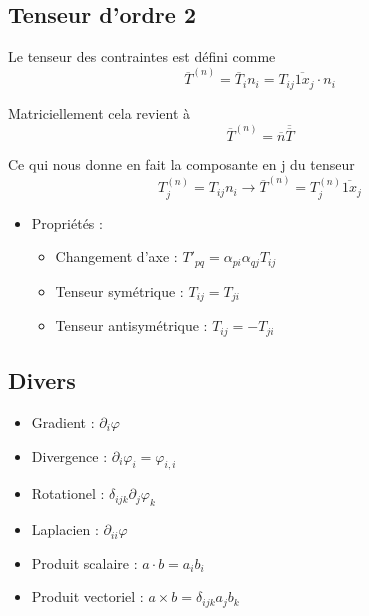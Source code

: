 \subsection*{Tenseur d'ordre 2}
\begin{multicols}{2}
\noindent Le tenseur des contraintes est défini comme
\begin{equation}
\overline{T}^{(n)} = \overline{T}_i n_i = T_{ij} \overline{1x}_j \cdot n_i
\end{equation}

Matriciellement cela revient à
\begin{equation}
\overline{T}^{(n)} = \overline{n}\overline{\overline{T}}
\end{equation}
\end{multicols}
Ce qui nous donne en fait la composante en j du tenseur 
\begin{equation}
T_j^{(n)} = T_{ij} n_i \rightarrow \overline{T}^{(n)}= T_j^{(n)} \overline{1x}_j  
\end{equation}


\begin{itemize}
	\item Propriétés : 
		\begin{itemize}
			\item Changement d'axe : $T'_{pq} = \alpha _{pi} \alpha _{qj} T_{ij}$ 
			\item Tenseur symétrique : $T_{ij} = T_{ji}$
			\item Tenseur antisymétrique : $T_{ij} = - T_{ji}$		
		\end{itemize}
\end{itemize}

\subsection*{Divers}
\begin{multicols}{2}
\begin{itemize}
	\item Gradient : $\partial _i \varphi$
	\item Divergence : $\partial _i \varphi _i = \varphi _{i,i}$
	\item Rotationel : $\delta _{ijk} \partial _j \varphi _k$
	\item Laplacien : $\partial _{ii} \varphi$
	\item Produit scalaire : $a \cdot b = a_i b_i$
	\item Produit vectoriel : $a \times b = \delta _{ijk} a_j b_k$
\end{itemize}
\end{multicols}